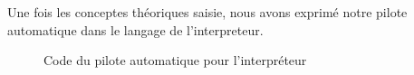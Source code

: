 \documentclass[a4paper,11pt]{article}
\begin{document}
    Une fois les conceptes théoriques saisie, nous avons exprimé notre pilote automatique dans le langage de l'interpreteur.

    \begin{figure}[H]
        \begin{center}
            \caption{Code du pilote automatique pour l’interpréteur}
            
            \label{fig:codeAutoPilot}
        \end{center}
    \end{figure}
\end{document}
